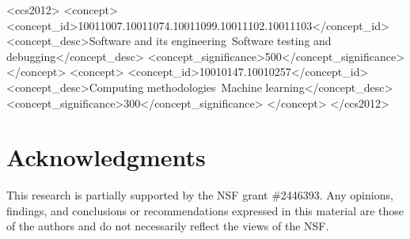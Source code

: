 \documentclass[sigplan,screen]{acmart}
\begin{document}


\begin{CCSXML}
    <ccs2012>
        <concept>
            <concept_id>10011007.10011074.10011099.10011102.10011103</concept_id>
            <concept_desc>Software and its engineering~Software testing and debugging</concept_desc>
            <concept_significance>500</concept_significance>
        </concept>
        <concept>
            <concept_id>10010147.10010257</concept_id>
            <concept_desc>Computing methodologies~Machine learning</concept_desc>
            <concept_significance>300</concept_significance>
        </concept>
    </ccs2012>
\end{CCSXML}




\maketitle








\section*{Acknowledgments}
This research is partially supported by the NSF grant \#2446393.
Any opinions, findings, and conclusions or recommendations expressed in this material are those of the authors and do not necessarily
reflect the views of the NSF.



\end{document}
